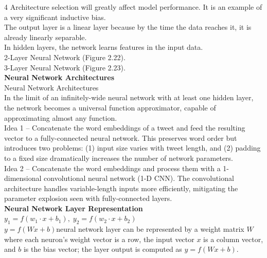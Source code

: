 \documentclass[8pt]{extarticle}
\begin{document}
\begin{multicols}{4}
Architecture selection will greatly affect model performance. It is an example of a very significant inductive bias.\\
The output layer is a linear layer because by the time the data reaches it, it is already linearly separable.\\
In hidden layers, the network learns features in the input data.\\
2-Layer Neural Network (Figure 2.22).\\
3-Layer Neural Network (Figure 2.23).\\
\vspace{2pt}\textbf{Neural Network Architectures}\\
Neural Network Architectures\\
In the limit of an infinitely-wide neural network with at least one hidden layer, the network becomes a universal function approximator, capable of approximating almost any function.\\
Idea 1 -- Concatenate the word embeddings of a tweet and feed the resulting vector to a fully-connected neural network. This preserves word order but introduces two problems: (1) input size varies with tweet length, and (2) padding to a fixed size dramatically increases the number of network parameters.\\
Idea 2 -- Concatenate the word embeddings and process them with a 1-dimensional convolutional neural network (1-D CNN). The convolutional architecture handles variable-length inputs more efficiently, mitigating the parameter explosion seen with fully-connected layers.\\
\vspace{2pt}\textbf{Neural Network Layer Representation}\\
$ y_1 = f(w_1 \cdot x + b_1), \; y_2 = f(w_2 \cdot x + b_2)$ \\
$ y = f(Wx + b)$\A neural network layer can be represented by a weight matrix $W$ where each neuron's weight vector is a row, the input vector $ x$ is a column vector, and $ b$ is the bias vector; the layer output is computed as $ y = f(Wx + b)$.\\


\end{multicols}
\end{document}
